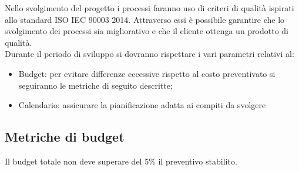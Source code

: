\documentclass[../piano_di_qualifica.tex]{subfiles}
\begin{document}
Nello svolgimento del progetto i processi faranno uso di criteri di qualità ispirati allo standard ISO IEC 90003 2014. Attraverso essi è possibile garantire che lo svolgimento dei processi sia migliorativo e che il cliente ottenga un prodotto di qualità. \\
Durante il periodo di sviluppo si dovranno rispettare i vari parametri relativi al:
\begin{itemize}
\item Budget: per evitare differenze eccessive rispetto al costo preventivato si seguiranno le metriche di seguito descritte;
\item Calendario: assicurare la pianificazione adatta ai compiti da svolgere
\end{itemize}
%


\subsection{Metriche di budget}%
\label{sub:metr_bud}
Il budget totale non deve superare del 5\% il preventivo stabilito.
\end{document}
